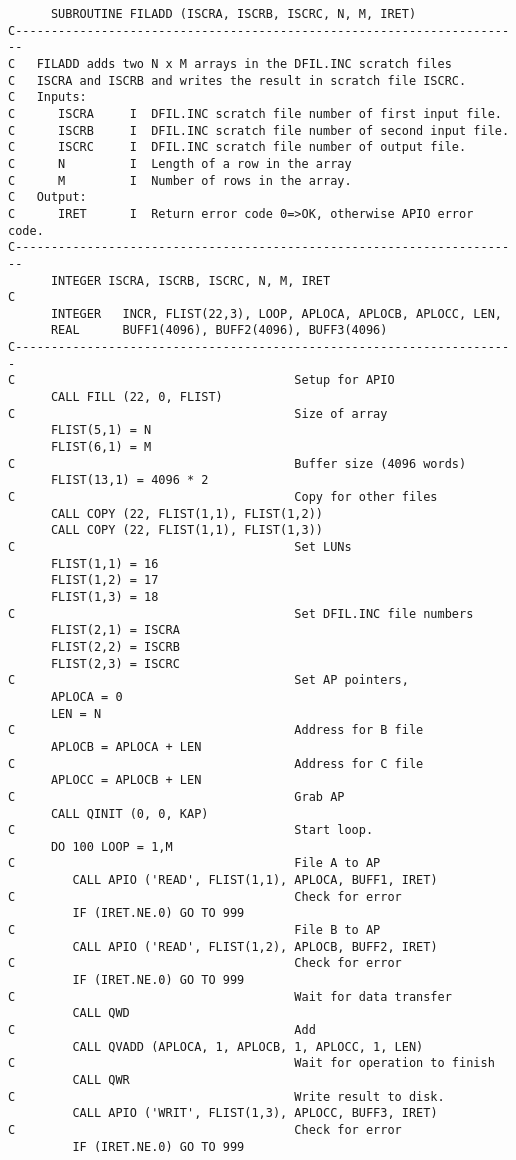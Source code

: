 \begin{verbatim}
      SUBROUTINE FILADD (ISCRA, ISCRB, ISCRC, N, M, IRET)
C-----------------------------------------------------------------------
C   FILADD adds two N x M arrays in the DFIL.INC scratch files
C   ISCRA and ISCRB and writes the result in scratch file ISCRC.
C   Inputs:
C      ISCRA     I  DFIL.INC scratch file number of first input file.
C      ISCRB     I  DFIL.INC scratch file number of second input file.
C      ISCRC     I  DFIL.INC scratch file number of output file.
C      N         I  Length of a row in the array
C      M         I  Number of rows in the array.
C   Output:
C      IRET      I  Return error code 0=>OK, otherwise APIO error code.
C-----------------------------------------------------------------------
      INTEGER ISCRA, ISCRB, ISCRC, N, M, IRET
C
      INTEGER   INCR, FLIST(22,3), LOOP, APLOCA, APLOCB, APLOCC, LEN,
      REAL      BUFF1(4096), BUFF2(4096), BUFF3(4096)
C----------------------------------------------------------------------
C                                       Setup for APIO
      CALL FILL (22, 0, FLIST)
C                                       Size of array
      FLIST(5,1) = N
      FLIST(6,1) = M
C                                       Buffer size (4096 words)
      FLIST(13,1) = 4096 * 2
C                                       Copy for other files
      CALL COPY (22, FLIST(1,1), FLIST(1,2))
      CALL COPY (22, FLIST(1,1), FLIST(1,3))
C                                       Set LUNs
      FLIST(1,1) = 16
      FLIST(1,2) = 17
      FLIST(1,3) = 18
C                                       Set DFIL.INC file numbers
      FLIST(2,1) = ISCRA
      FLIST(2,2) = ISCRB
      FLIST(2,3) = ISCRC
C                                       Set AP pointers,
      APLOCA = 0
      LEN = N
C                                       Address for B file
      APLOCB = APLOCA + LEN
C                                       Address for C file
      APLOCC = APLOCB + LEN
C                                       Grab AP
      CALL QINIT (0, 0, KAP)
C                                       Start loop.
      DO 100 LOOP = 1,M
C                                       File A to AP
         CALL APIO ('READ', FLIST(1,1), APLOCA, BUFF1, IRET)
C                                       Check for error
         IF (IRET.NE.0) GO TO 999
C                                       File B to AP
         CALL APIO ('READ', FLIST(1,2), APLOCB, BUFF2, IRET)
C                                       Check for error
         IF (IRET.NE.0) GO TO 999
C                                       Wait for data transfer
         CALL QWD
C                                       Add
         CALL QVADD (APLOCA, 1, APLOCB, 1, APLOCC, 1, LEN)
C                                       Wait for operation to finish
         CALL QWR
C                                       Write result to disk.
         CALL APIO ('WRIT', FLIST(1,3), APLOCC, BUFF3, IRET)
C                                       Check for error
         IF (IRET.NE.0) GO TO 999


\end{verbatim}
